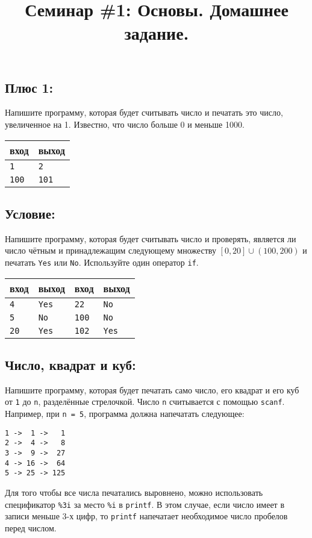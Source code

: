 \documentclass[10pt]{article}
\begin{document}
\title{Семинар \#1: Основы. Домашнее задание.\vspace{-5ex}}\date{}\maketitle

\subsection{Плюс 1:} 
Напишите программу, которая будет считывать число и печатать это число, увеличенное на 1. Известно, что число больше 0 и меньше 1000.
\begin{center}
\begin{tabular}{ l | l }
 вход & выход\\ \hline
 \texttt{1} & \texttt{2} \\ 
 \texttt{100} & \texttt{101} \\ 
\end{tabular}
\end{center}



\subsection{Условие:} 
Напишите программу, которая будет считывать число и проверять, является ли число чётным и принадлежащим следующему множеству 
$[0, 20] \cup (100, 200)$ и печатать \texttt{Yes} или \texttt{No}. Используйте один оператор \texttt{if}.

\begin{center}
\begin{tabular}{ l l | l l }
 вход & выход & вход & выход \\ \hline
 \texttt{4} & \texttt{Yes} & \texttt{22} & \texttt{No}   \\ 
 \texttt{5} & \texttt{No} &\texttt{100} & \texttt{No}  \\ 
 \texttt{20} & \texttt{Yes} & \texttt{102} & \texttt{Yes} \\ 
\end{tabular}
\end{center}


\subsection{Число, квадрат и куб:} 
Напишите программу, которая будет печатать само число, его квадрат и его куб от \texttt{1} до \texttt{n}, разделённые стрелочкой.
Число \texttt{n} считывается с помощью \texttt{scanf}. 
Например, при \texttt{n = 5}, программа должна напечатать следующее:
\begin{verbatim}
1 ->  1 ->   1
2 ->  4 ->   8
3 ->  9 ->  27
4 -> 16 ->  64
5 -> 25 -> 125
\end{verbatim}
Для того чтобы все числа печатались выровнено, можно использовать спецификатор \texttt{\%3i} за место \texttt{\%i} в \texttt{printf}. В этом случае, если число имеет в записи меньше 3-х цифр, то \texttt{printf} напечатает необходимое число пробелов перед числом.
\end{document}
